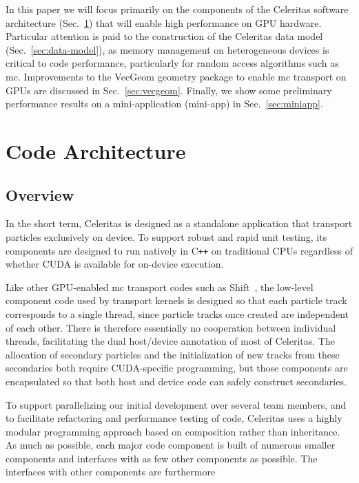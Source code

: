 \documentclass{webofc}
\newcommand{\Cpp}{C\texttt{++}\xspace}
\begin{document}

In this paper we will focus primarily on the components of the Celeritas
software architecture (Sec.~\ref{sec:code-arch}) that will enable high
performance on GPU hardware.  Particular attention is paid to the construction
of the Celeritas data model (Sec.~\ref{sec:data-model}), as memory management on
heterogeneous devices is critical to code performance, particularly for random
access algorithms such as \ac{mc}.  Improvements to the VecGeom geometry package to enable \ac{mc} transport on GPUs are discussed in Sec.~\ref{sec:vecgeom}.  Finally, we show some preliminary performance results on a mini-application (mini-app) in Sec.~\ref{sec:miniapp}.

\section{Code Architecture}
\label{sec:code-arch}

\subsection{Overview}
\label{sec:overview}

In the short term, Celeritas is designed as a standalone application
that transport particles exclusively on device. To support robust and
rapid unit testing, its components are designed to run natively in \Cpp
on traditional CPUs regardless of whether CUDA is available for
on-device execution.

Like other GPU-enabled \ac{mc} transport codes such as
Shift~\cite{pandya_implementation_2016,hamilton_continuous-energy_2019}, the
low-level component code used by transport kernels is designed so that each
particle track corresponds to a single thread, since particle tracks once
created are independent of each other. There is therefore essentially no
cooperation between individual threads, facilitating the dual host/device
annotation of most of Celeritas. The allocation of secondary particles and the
initialization of new tracks from these secondaries both require CUDA-specific
programming, but those components are encapsulated so that both host and device
code can safely construct secondaries.

To support parallelizing our initial development over several team
members, and to facilitate refactoring and performance testing of code,
Celeritas uses a highly modular programming approach based on
composition rather than inheritance. As much as possible, each major
code component is built of numerous smaller components and interfaces
with as few other components as possible. The interfaces with other
components are furthermore
\end{document}
